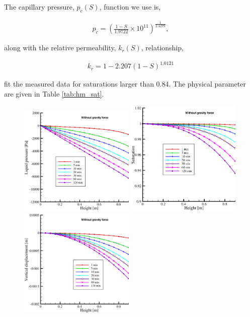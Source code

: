 The capillary pressure, $p_c(S)$, function we use is,

\begin{eqnarray}
p_c
=
\left(
\frac{1-S}{1.9722}
\times 10^{11}
\right)^{\frac{1}{2.4279}},
\label{eq:hm_sat_p_s}
\end{eqnarray}

along with the relative permeability, $k_r(S)$, relationship,

\begin{eqnarray}
k_r
=
1 - 2.207(1-S)^{1.0121}
\label{eq:hm_sat_rs}
\end{eqnarray}

fit the measured data for saturations larger than 0.84. The physical parameter are given in Table \ref{tab:hm_sat}.

\begin{figure}[!t]
\begin{center}
\includegraphics[width=0.49\textwidth]{chapter_14/figures/fig_14_2_13_a}
\includegraphics[width=0.49\textwidth]{chapter_14/figures/fig_14_2_13_b}
\includegraphics[width=0.49\textwidth]{chapter_14/figures/fig_14_2_13_c}

\end{center}
\end{figure}
